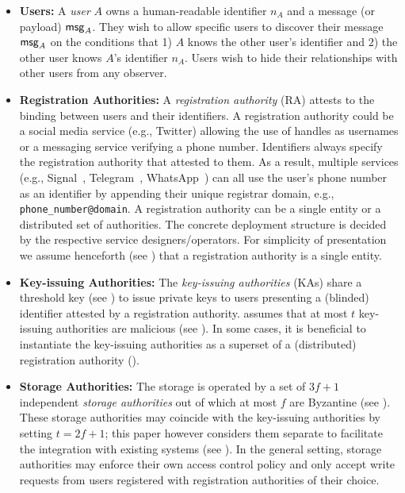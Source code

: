 \begin{itemize}
    \item \textbf{Users: } A \emph{user} $A$ owns a human-readable identifier $n_A$ and a message (or payload) $\mathsf{msg}_A$. They wish to allow specific users to discover their message $\mathsf{msg}_A$ on the conditions that 1) $A$ knows the other user's identifier and 2) the other user knows $A$'s identifier $n_A$. Users wish to hide their relationships with other users from any observer.
    \item \textbf{Registration Authorities: } A \emph{registration authority} (RA) attests to the binding between users and their identifiers. A registration authority could be a social media service (e.g., Twitter) allowing the use of handles as usernames or a messaging service verifying a phone number. Identifiers always specify the registration authority that attested to them. As a result, multiple services (e.g., Signal~\cite{signal}, Telegram~\cite{telegram}, WhatsApp~\cite{whatsapp}) can all use the user's phone number as an identifier by appending their unique registrar domain, e.g., \texttt{phone\_number@domain}. A registration authority can be a single entity or a distributed set of authorities. The concrete deployment structure is decided by the respective service designers/operators. For simplicity of presentation we assume henceforth (see ) that a registration authority is a single entity.
    \item \textbf{Key-issuing Authorities: } The \emph{key-issuing authorities} (KAs) share a threshold key (see ) to issue private keys to users presenting a (blinded) identifier attested by a registration authority. \sysname assumes that at most $t$ key-issuing authorities are malicious (see ). In some cases, it is beneficial to instantiate the key-issuing authorities as a superset of a (distributed) registration authority ().
    \item \textbf{Storage Authorities: } The \sysname storage is operated by a set of $3f+1$ independent \emph{storage authorities} out of which at most $f$ are Byzantine (see ). These storage authorities may coincide with the key-issuing authorities by setting $t=2f+1$; this paper however considers them separate to facilitate the integration with existing systems (see ). In the general setting, storage authorities may enforce their own access control policy and only accept write requests from users registered with registration authorities of their choice.
\end{itemize}

